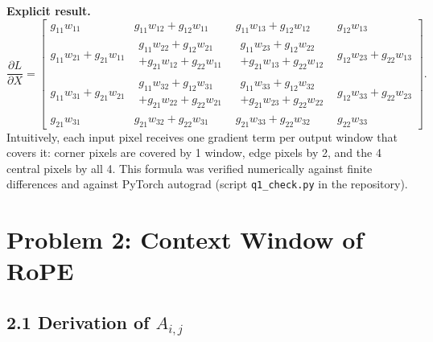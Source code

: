 \documentclass[11pt]{article}
\begin{document}
\textbf{Explicit result.}
{\small
\[
\frac{\partial L}{\partial X}=
\begin{bmatrix}
g_{11}w_{11} & g_{11}w_{12}+g_{12}w_{11} & g_{11}w_{13}+g_{12}w_{12} & g_{12}w_{13}\\[2pt]
g_{11}w_{21}+g_{21}w_{11} & \begin{smallmatrix}g_{11}w_{22}+g_{12}w_{21}\\+g_{21}w_{12}+g_{22}w_{11}\end{smallmatrix} & \begin{smallmatrix}g_{11}w_{23}+g_{12}w_{22}\\+g_{21}w_{13}+g_{22}w_{12}\end{smallmatrix} & g_{12}w_{23}+g_{22}w_{13}\\[6pt]
g_{11}w_{31}+g_{21}w_{21} & \begin{smallmatrix}g_{11}w_{32}+g_{12}w_{31}\\+g_{21}w_{22}+g_{22}w_{21}\end{smallmatrix} & \begin{smallmatrix}g_{11}w_{33}+g_{12}w_{32}\\+g_{21}w_{23}+g_{22}w_{22}\end{smallmatrix} & g_{12}w_{33}+g_{22}w_{23}\\[6pt]
g_{21}w_{31} & g_{21}w_{32}+g_{22}w_{31} & g_{21}w_{33}+g_{22}w_{32} & g_{22}w_{33}
\end{bmatrix}.
\]
}
Intuitively, each input pixel receives one gradient term per output window that covers it: corner pixels are covered by 1 window, edge pixels by 2, and the 4 central pixels by all 4. This formula was verified numerically against finite differences and against PyTorch autograd (script \texttt{q1\_check.py} in the repository).

\section*{Problem 2: Context Window of RoPE}

\subsection*{2.1 Derivation of $A_{i,j}$}
\end{document}
